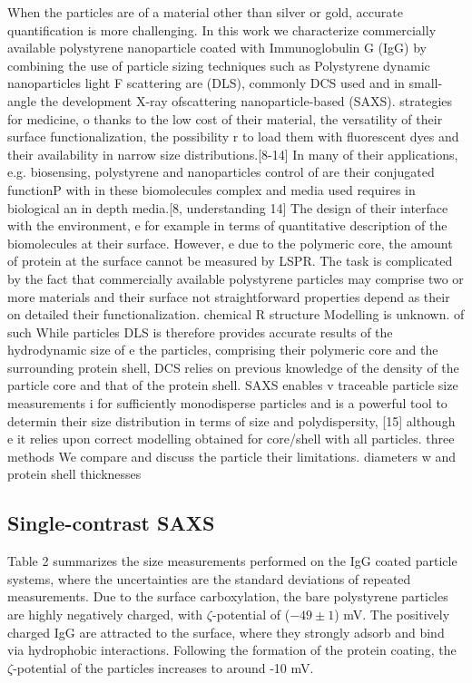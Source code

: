 When the particles are of a material other than silver or gold, accurate quantification is more challenging. In this work we characterize commercially available polystyrene nanoparticle coated with Immunoglobulin G (IgG) by combining the use of particle sizing techniques such as Polystyrene dynamic nanoparticles light F scattering are (DLS), commonly DCS used and in small-angle the development X-ray ofscattering nanoparticle-based  (SAXS). strategies for medicine, o thanks to the low cost of their material, the versatility of their surface functionalization, the possibility r to load them with fluorescent dyes and their availability in narrow size distributions.[8-14] In many of their applications, e.g. biosensing, polystyrene and nanoparticles control of are their conjugated functionP with in these biomolecules complex and media used requires in biological an in depth media.[8, understanding 14] The design  of their interface with the environment, e  for example in terms of quantitative description of the biomolecules at their surface. However, e due to the polymeric core, the amount of protein at the surface cannot be measured by LSPR. The task is complicated by the fact that commercially available polystyrene particles may comprise two or more materials and their surface not straightforward properties depend as their on detailed their functionalization. chemical R structure Modelling is unknown. of such While particles DLS is therefore  provides accurate results of the hydrodynamic size of e  the particles, comprising their polymeric core and the surrounding protein shell, DCS relies on previous knowledge of the density of the particle core and that of the protein shell. SAXS enables v traceable particle size measurements i for sufficiently monodisperse particles and is a powerful tool to determin their size distribution in terms of size and polydispersity, [15] although e it relies upon correct modelling obtained for core/shell with all particles. three methods We compare and discuss the particle their limitations.  diameters w  and protein shell thicknesses


\subsection{Single-contrast SAXS}
Table 2 summarizes the size measurements performed on the IgG coated particle systems, where the uncertainties are the standard deviations of repeated measurements. Due to the surface carboxylation, the bare polystyrene particles are highly negatively charged, with $\zeta$-potential of ($-49 \pm 1$) mV. The positively charged IgG are attracted to the surface, where they strongly adsorb and bind via hydrophobic interactions. Following the formation of the protein coating, the $\zeta$-potential of the particles increases to around -10 mV. 


